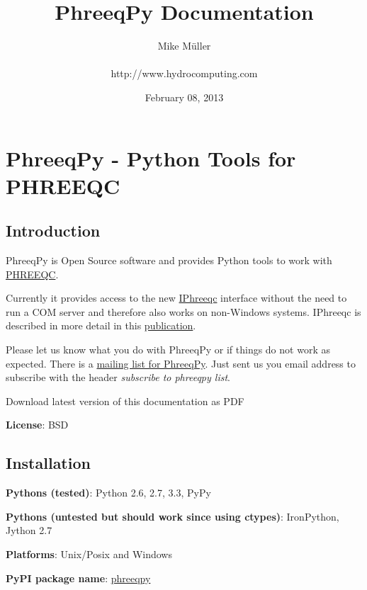 \documentclass[letterpaper,10pt,english]{sphinxmanual}
\title{PhreeqPy Documentation}
\date{February 08, 2013}
\author{Mike Müller\\\\ http://www.hydrocomputing.com}
\begin{document}
\maketitle
\tableofcontents
{}\label{contents::doc}



\chapter{PhreeqPy - Python Tools for PHREEQC}
\label{index:full-phreecpy-documentation}\label{index:toc}\label{index::doc}\label{index:phreeqpy-python-tools-for-phreeqc}

\section{Introduction}
\label{index:introduction}
PhreeqPy is Open Source software and provides Python tools to work with
\href{http://wwwbrr.cr.usgs.gov/projects/GWC\_coupled/phreeqc/index.html}{PHREEQC}.

Currently it provides access to the new \href{ftp://brrftp.cr.usgs.gov/pub/charlton/iphreeqc/IPhreeqc.pdf}{IPhreeqc} interface without the need to
run a COM server and therefore also works on non-Windows systems.
IPhreeqc is described in more detail in this \href{http://www.sciencedirect.com/science/article/pii/S0098300411000653}{publication}.

Please let us know what you do with PhreeqPy or if things do not work
as expected. There is a
\href{https://groups.google.com/forum/\#!forum/phreeqpy-users}{mailing list for PhreeqPy}.
Just sent us you email address to subscribe with the header \emph{subscribe to phreeqpy list}.

Download latest version of this documentation as PDF

\textbf{License}: BSD


\section{Installation}
\label{index:installation}\label{index:id1}
\textbf{Pythons (tested)}: Python 2.6, 2.7, 3.3, PyPy

\textbf{Pythons (untested but should work since using ctypes)}: IronPython, Jython 2.7

\textbf{Platforms}: Unix/Posix and Windows

\textbf{PyPI package name}: \href{http://pypi.python.org/pypi/phreeqpy}{phreeqpy}
\end{document}
